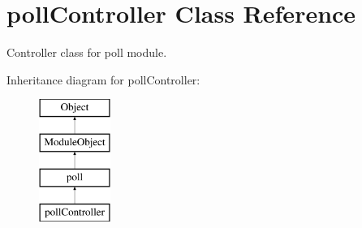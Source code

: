 \hypertarget{classpollController}{\section{poll\+Controller Class Reference}
\label{classpollController}
}


Controller class for poll module.  


Inheritance diagram for poll\+Controller\+:\begin{figure}[H]
\begin{center}
\leavevmode
\includegraphics[height=4.000000cm]{classpollController}
\end{center}
\end{figure}
